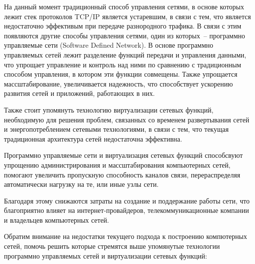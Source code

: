 \documentclass[bachelor, och, coursework]{SCWorks}
\begin{document}

\graphicspath{{./images/}}

\tableofcontents

\intro
На данный момент традиционный способ управления сетями, в основе которых лежит стек протоколов TCP/IP является устаревшим, в связи с тем, что является недостаточно эффективым при передаче разнородного трафика\cite{arccn}. В связи с этим появляются другие способы управления сетями, один из которых~-- программно управляемые сети (Software Defined Network). В основе программно управляемых сетей лежит разделение функций передачи и управления данными, что упрощает управление и контроль над ними по сравнению с традиционным способом управления, в котором эти функции совмещены. Также упрощается массштабирование, увеличивается надежность, что способствует ускорению развития сетей и приложений, работающих в них.

Также стоит упомянуть технологию виртуализации сетевых функций, необходимую для решения проблем, связанных со временем развертывания сетей и энергопотреблением сетевыми технологиями, в связи с тем, что текущая традиционная архитектура сетей недостаточна эффективна. 

Программно управляемые сети и виртуализация сетевых функций способсвуют упрощению администрирования и массштабирования компьютерных сетей, помогают увеличить пропускную способность каналов связи, перераспределяя автоматически нагрузку на те, или иные узлы сети\cite{osp}.

Благодаря этому снижаются затраты на создание и поддержание работы сети, что благоприятно влияет на интернет-провайдеров, телекоммуникационные компании и владельцев компьютерных сетей. 

Обратим внимание на недостатки текущего подхода к построению компютерных сетей, помочь решить которые стремятся выше упомянутые технологии программно управляемых сетей и виртуализации сетевых функций\cite{mctrewards}: 
\end{document}

